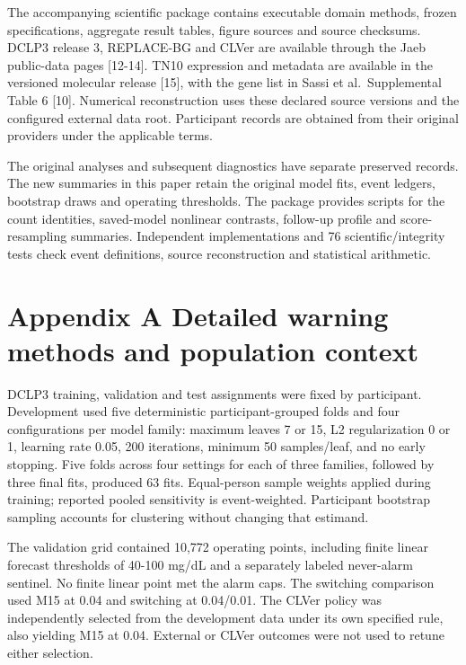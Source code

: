 \documentclass[
  american,
  11pt,
  letterpaper,
]{article}
\begin{document}
The accompanying scientific package contains executable domain methods,
frozen specifications, aggregate result tables, figure sources and
source checksums. DCLP3 release 3, REPLACE-BG and CLVer are available
through the Jaeb public-data pages {[}12-14{]}. TN10 expression and
metadata are available in the versioned molecular release {[}15{]}, with
the gene list in Sassi et al.~Supplemental Table 6 {[}10{]}. Numerical
reconstruction uses these declared source versions and the configured
external data root. Participant records are obtained from their original
providers under the applicable terms.

The original analyses and subsequent diagnostics have separate preserved
records. The new summaries in this paper retain the original model fits,
event ledgers, bootstrap draws and operating thresholds. The package
provides scripts for the count identities, saved-model nonlinear
contrasts, follow-up profile and score-resampling summaries. Independent
implementations and 76 scientific/integrity tests check event
definitions, source reconstruction and statistical arithmetic.

\section{Appendix A Detailed warning methods and population
context}\label{appendix-a-detailed-warning-methods-and-population-context}

DCLP3 training, validation and test assignments were fixed by
participant. Development used five deterministic participant-grouped
folds and four configurations per model family: maximum leaves 7 or 15,
L2 regularization 0 or 1, learning rate 0.05, 200 iterations, minimum 50
samples/leaf, and no early stopping. Five folds across four settings for
each of three families, followed by three final fits, produced 63 fits.
Equal-person sample weights applied during training; reported pooled
sensitivity is event-weighted. Participant bootstrap sampling accounts
for clustering without changing that estimand.

The validation grid contained 10,772 operating points, including finite
linear forecast thresholds of 40-100 mg/dL and a separately labeled
never-alarm sentinel. No finite linear point met the alarm caps. The
switching comparison used M15 at 0.04 and switching at 0.04/0.01. The
CLVer policy was independently selected from the development data under
its own specified rule, also yielding M15 at 0.04. External or CLVer
outcomes were not used to retune either selection.
\end{document}
